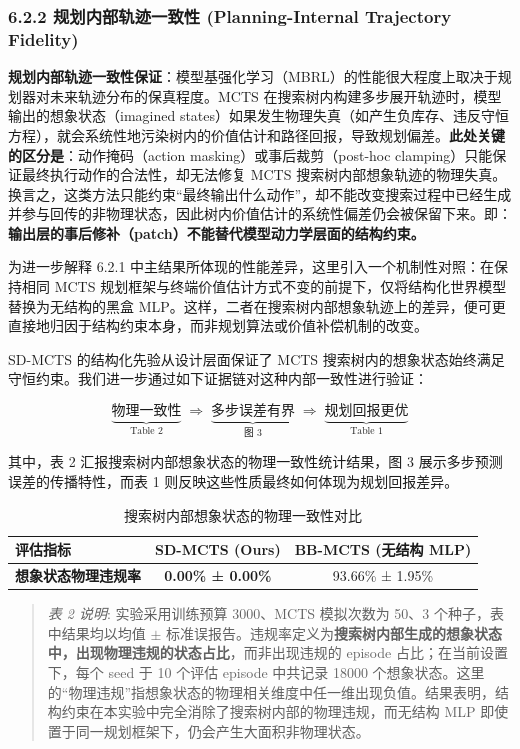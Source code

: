 \documentclass[UTF8]{ctexart}
\begin{document}
\subsubsection{6.2.2 规划内部轨迹一致性 (Planning-Internal Trajectory Fidelity)}

\textbf{规划内部轨迹一致性保证}：模型基强化学习（MBRL）的性能很大程度上取决于规划器对未来轨迹分布的保真程度。MCTS
在搜索树内构建多步展开轨迹时，模型输出的想象状态（imagined
states）如果发生物理失真（如产生负库存、违反守恒方程），就会系统性地污染树内的价值估计和路径回报，导致规划偏差。\textbf{此处关键的区分是}：动作掩码（action
masking）或事后裁剪（post-hoc clamping）只能保证最终执行动作的合法性，却无法修复
MCTS 搜索树内部想象轨迹的物理失真。换言之，这类方法只能约束“最终输出什么动作”，却不能改变搜索过程中已经生成并参与回传的非物理状态，因此树内价值估计的系统性偏差仍会被保留下来。即：\textbf{输出层的事后修补（patch）不能替代模型动力学层面的结构约束。}

为进一步解释 6.2.1 中主结果所体现的性能差异，这里引入一个机制性对照：在保持相同
MCTS 规划框架与终端价值估计方式不变的前提下，仅将结构化世界模型替换为无结构的黑盒
MLP。这样，二者在搜索树内部想象轨迹上的差异，便可更直接地归因于结构约束本身，而非规划算法或价值补偿机制的改变。

SD-MCTS 的结构化先验从设计层面保证了 MCTS 搜索树内的想象状态始终满足守恒约束。我们进一步通过如下证据链对这种内部一致性进行验证：

\[\underbrace{\text{物理一致性}}_{{\text{Table 2}}} \;\Rightarrow\; \underbrace{\text{多步误差有界}}_{\text{图 3}} \;\Rightarrow\; \underbrace{\text{规划回报更优}}_{\text{Table 1}}\]

其中，表 2 汇报搜索树内部想象状态的物理一致性统计结果，图 3 展示多步预测误差的传播特性，而表 1 则反映这些性质最终如何体现为规划回报差异。

\begin{table}[ht]
\centering
\caption{搜索树内部想象状态的物理一致性对比}
\begin{tabular}{l c c}
\toprule
评估指标 & SD-MCTS (Ours) & BB-MCTS (无结构 MLP) \\
\midrule
\textbf{想象状态物理违规率} & \textbf{0.00\% ± 0.00\%} & 93.66\% ± 1.95\% \\
\bottomrule
\end{tabular}
\end{table}

\begin{quote}
\emph{表 2 说明}:
实验采用训练预算 3000、MCTS 模拟次数为 50、3 个种子，表中结果均以均值 $\pm$ 标准误报告。违规率定义为\textbf{搜索树内部生成的想象状态中，出现物理违规的状态占比}，而非出现违规的 episode
占比；在当前设置下，每个 seed 于 10 个评估 episode 中共记录 18000 个想象状态。这里的“物理违规”指想象状态的物理相关维度中任一维出现负值。结果表明，结构约束在本实验中完全消除了搜索树内部的物理违规，而无结构 MLP
即使置于同一规划框架下，仍会产生大面积非物理状态。
\end{quote}
\end{document}
